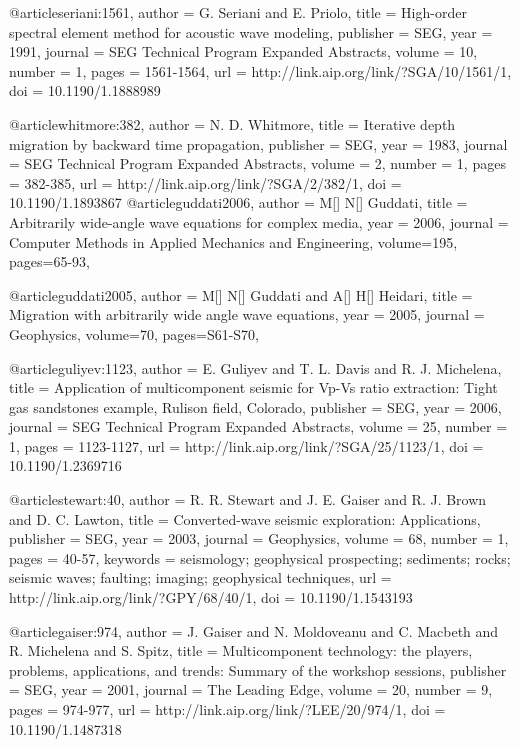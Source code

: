 @article{seriani:1561,
  author =	 {G. Seriani and E. Priolo},
  title =	 {High-order spectral element method for acoustic wave
                  modeling},
  publisher =	 {SEG},
  year =	 1991,
  journal =	 {SEG Technical Program Expanded Abstracts},
  volume =	 10,
  number =	 1,
  pages =	 {1561-1564},
  url =		 {http://link.aip.org/link/?SGA/10/1561/1},
  doi =		 {10.1190/1.1888989}
}

@article{whitmore:382,
  author =	 {N. D. Whitmore},
  title =	 {Iterative depth migration by backward time
                  propagation},
  publisher =	 {SEG},
  year =	 1983,
  journal =	 {SEG Technical Program Expanded Abstracts},
  volume =	 2,
  number =	 1,
  pages =	 {382-385},
  url =		 {http://link.aip.org/link/?SGA/2/382/1},
  doi =		 {10.1190/1.1893867}
}
@article{guddati2006,
  author =	 {M[] N[] Guddati},
  title =	 {Arbitrarily wide-angle wave equations for complex media},
  year =	 2006,
  journal =	 {Computer Methods in Applied Mechanics and Engineering},
  volume={195},
 pages=65-93,
}

@article{guddati2005,
  author =	 {M[] N[] Guddati and A[] H[] Heidari},
  title =	 {Migration with arbitrarily wide angle wave equations},
  year =	 2005,
  journal =	 {Geophysics},
  volume={70},
 pages=S61-S70,
}

@article{guliyev:1123,
  author =	 {E. Guliyev and T. L. Davis and R.
                  J. Michelena},
  title =	 {Application of multicomponent seismic for Vp-Vs
                  ratio extraction: Tight gas sandstones example,
                  Rulison field, Colorado},
  publisher =	 {SEG},
  year =	 2006,
  journal =	 {SEG Technical Program Expanded Abstracts},
  volume =	 25,
  number =	 1,
  pages =	 {1123-1127},
  url =		 {http://link.aip.org/link/?SGA/25/1123/1},
  doi =		 {10.1190/1.2369716}
}

@article{stewart:40,
  author =	 {R. R. Stewart and J. E. Gaiser and R. J.
                  Brown and D. C. Lawton},
  title =	 {Converted-wave seismic exploration: Applications},
  publisher =	 {SEG},
  year =	 2003,
  journal =	 {Geophysics},
  volume =	 68,
  number =	 1,
  pages =	 {40-57},
  keywords =	 {seismology; geophysical prospecting; sediments;
                  rocks; seismic waves; faulting; imaging; geophysical
                  techniques},
  url =		 {http://link.aip.org/link/?GPY/68/40/1},
  doi =		 {10.1190/1.1543193}
}

@article{gaiser:974,
  author =	 {J. Gaiser and N. Moldoveanu and C. Macbeth
                  and R. Michelena and S. Spitz},
  title =	 {Multicomponent technology: the players, problems,
                  applications, and trends: Summary of the workshop
                  sessions},
  publisher =	 {SEG},
  year =	 2001,
  journal =	 {The Leading Edge},
  volume =	 20,
  number =	 9,
  pages =	 {974-977},
  url =		 {http://link.aip.org/link/?LEE/20/974/1},
  doi =		 {10.1190/1.1487318}
}

